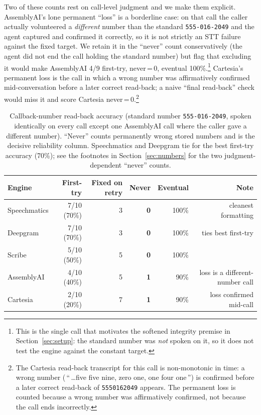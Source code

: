 \documentclass[11pt]{article}
\begin{document}
Two of these counts rest on call-level judgment and we make them explicit.
AssemblyAI's lone permanent ``loss'' is a borderline case: on that call the
caller actually volunteered a \emph{different} number than the standard
\texttt{555-016-2049} and the agent captured and confirmed it correctly, so it
is not strictly an STT failure against the fixed target. We retain it in the
``never'' count conservatively (the agent did not end the call holding the
standard number) but flag that excluding it would make AssemblyAI 4/9 first-try,
never\,=\,0, eventual 100\%.\footnote{This is the single call that motivates the
softened integrity premise in Section~\ref{sec:setup}: the standard number was
\emph{not} spoken on it, so it does not test the engine against the constant
target.} Cartesia's permanent loss is the call in which a wrong number was
affirmatively confirmed mid-conversation before a later correct read-back; a
naive ``final read-back'' check would miss it and score Cartesia
never\,=\,0.\footnote{The Cartesia read-back transcript for this call is
non-monotonic in time: a wrong number (\,``\,\dots five five nine, zero one, one
four one\,'') is confirmed before a later correct read-back of
\texttt{5550162049} appears. The permanent loss is counted because a wrong
number was affirmatively confirmed, not because the call ends incorrectly.}

\begin{table}[ht]
\centering
\small
\begin{tabular}{@{}lrrrrr@{}}
\toprule
\textbf{Engine} & \textbf{First-try} & \textbf{Fixed on retry} & \textbf{Never}
                & \textbf{Eventual} & \textbf{Note} \\
\midrule
Speechmatics & 7/10 (70\%) & 3 & \textbf{0} & 100\% & cleanest formatting \\
Deepgram & 7/10 (70\%) & 3 & \textbf{0} & 100\% & ties best first-try \\
Scribe & 5/10 (50\%) & 5 & \textbf{0} & 100\% & \\
AssemblyAI & 4/10 (40\%) & 5 & \textbf{1} & 90\% & loss is a different-number call \\
Cartesia & 2/10 (20\%) & 7 & \textbf{1} & 90\% & loss confirmed mid-call \\
\bottomrule
\end{tabular}
\caption{Callback-number read-back accuracy (standard number
\texttt{555-016-2049}, spoken identically on every call except one AssemblyAI
call where the caller gave a different number). ``Never'' counts permanently
wrong stored numbers and is the decisive reliability column. Speechmatics and
Deepgram tie for the best first-try accuracy (70\%); see the footnotes in
Section~\ref{sec:numbers} for the two judgment-dependent ``never'' counts.}
\label{tab:numbers}
\end{table}
\end{document}
